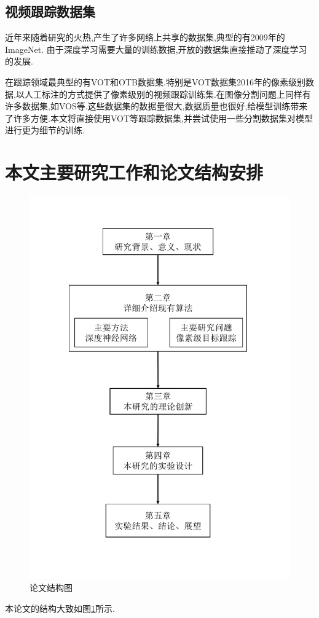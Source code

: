 \subsection{视频跟踪数据集}
近年来随着研究的火热,产生了许多网络上共享的数据集,典型的有2009年的ImageNet\supercite{imagenet_cvpr09}.
由于深度学习需要大量的训练数据,开放的数据集直接推动了深度学习的发展.
\par
在跟踪领域最典型的有VOT\supercite{VOT_TPAMI}和OTB\supercite{WuLimYang13}数据集.特别是VOT数据集2016年的像素级别数据\supercite{Vojir-TR-2017-01},以人工标注的方式提供了像素级别的视频跟踪训练集.在图像分割问题上同样有许多数据集,如VOS\supercite{Cae+17}等.这些数据集的数据量很大,数据质量也很好,给模型训练带来了许多方便.本文将直接使用VOT等跟踪数据集,并尝试使用一些分割数据集对模型进行更为细节的训练.

\section{本文主要研究工作和论文结构安排}


\par
\begin{figure}[htbp!]
    \centering
    \includegraphics[width = .8\textwidth]{chap/img/thesis_structure.pdf}
    \caption{论文结构图}
    \label{fig:thesis_structure}
\end{figure}
\par
本论文的结构大致如图\ref{fig:thesis_structure}所示.